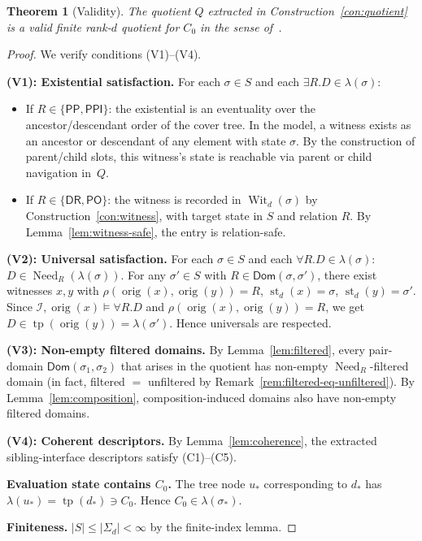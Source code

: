 \documentclass[11pt]{article}
\newtheorem{theorem}{Theorem}[section]
\theoremstyle{definition}
\theoremstyle{remark}
\newcommand{\DR}{\mathsf{DR}}
\newcommand{\PO}{\mathsf{PO}}
\newcommand{\PP}{\mathsf{PP}}
\newcommand{\PPI}{\mathsf{PPI}}
\newcommand{\tp}{\operatorname{tp}}
\newcommand{\st}{\operatorname{st}}
\newcommand{\orig}{\operatorname{orig}}
\newcommand{\Need}{\operatorname{Need}}
\newcommand{\Wit}{\operatorname{Wit}}
\newcommand{\Dom}{\mathsf{Dom}}
\begin{document}
\begin{theorem}[Validity]\label{thm:validity}
The quotient $Q$ extracted in Construction~\ref{con:quotient} is a
valid finite rank-$d$ quotient for $C_0$ in the sense
of~\cite[Definition~1.10]{SplitForest}.
\end{theorem}

\begin{proof}
We verify conditions (V1)--(V4).

\medskip\noindent\textbf{(V1): Existential satisfaction.}\;
For each $\sigma\in S$ and each $\exists R.D\in\lambda(\sigma)$:
\begin{itemize}
\item If $R\in\{\PP,\PPI\}$: the existential is an eventuality over
  the ancestor/descendant order of the cover tree.  In the model,
  a witness exists as an ancestor or descendant of any element with
  state $\sigma$.  By the construction of parent/child slots, this
  witness's state is reachable via parent or child navigation in~$Q$.
\item If $R\in\{\DR,\PO\}$: the witness is recorded in
  $\Wit_d(\sigma)$ by Construction~\ref{con:witness}, with target
  state in $S$ and relation $R$.  By Lemma~\ref{lem:witness-safe},
  the entry is relation-safe.
\end{itemize}

\medskip\noindent\textbf{(V2): Universal satisfaction.}\;
For each $\sigma\in S$ and each $\forall R.D\in\lambda(\sigma)$:
$D\in\Need_R(\lambda(\sigma))$.  For any $\sigma'\in S$ with
$R\in\Dom(\sigma,\sigma')$, there exist witnesses $x,y$ with
$\rho(\orig(x),\orig(y))=R$, $\st_d(x)=\sigma$, $\st_d(y)=\sigma'$.
Since $\mathcal{I},\orig(x)\models\forall R.D$ and
$\rho(\orig(x),\orig(y))=R$, we get $D\in\tp(\orig(y))=\lambda(\sigma')$.
Hence universals are respected.\;\checkmark

\medskip\noindent\textbf{(V3): Non-empty filtered domains.}\;
By Lemma~\ref{lem:filtered}, every pair-domain $\Dom(\sigma_1,\sigma_2)$
that arises in the quotient has non-empty $\Need_R$-filtered domain
(in fact, filtered $=$ unfiltered by
Remark~\ref{rem:filtered-eq-unfiltered}).  By
Lemma~\ref{lem:composition}, composition-induced domains also have
non-empty filtered domains.\;\checkmark

\medskip\noindent\textbf{(V4): Coherent descriptors.}\;
By Lemma~\ref{lem:coherence}, the extracted sibling-interface
descriptors satisfy (C1)--(C5).\;\checkmark

\medskip\noindent\textbf{Evaluation state contains $C_0$.}\;
The tree node $u_\ast$ corresponding to $d_\ast$ has
$\lambda(u_\ast)=\tp(d_\ast)\ni C_0$.  Hence
$C_0\in\lambda(\sigma_\ast)$.\;\checkmark

\medskip\noindent\textbf{Finiteness.}\;
$|S|\le|\Sigma_d|<\infty$ by the finite-index lemma.\;\checkmark
\end{proof}
\end{document}
